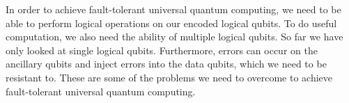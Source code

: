 In order to achieve fault-tolerant universal quantum computing, we need to be able to perform logical operations on our encoded logical qubits. To do useful computation, we also need the ability of multiple logical qubits. So far we have only looked at single logical qubits. Furthermore, errors can occur on the ancillary qubits and inject errors into the data qubits, which we need to be resistant to. These are some of the problems we need to overcome to achieve fault-tolerant universal quantum computing.
